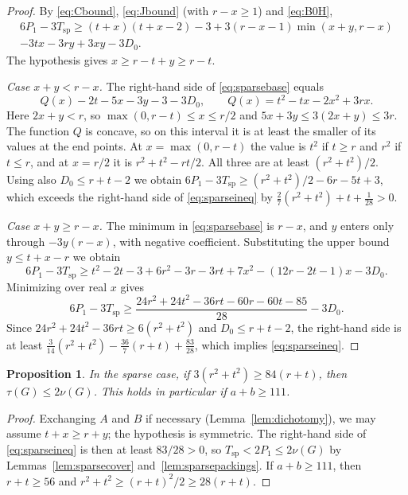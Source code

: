 \documentclass{amsart}
\newtheorem{proposition}[theorem]{Proposition}
\theoremstyle{definition}
\theoremstyle{remark}
\numberwithin{equation}{section}
\numberwithin{table}{section}
\begin{document}
\begin{proof}
By \eqref{eq:Cbound}, \eqref{eq:Jbound} (with $r-x\ge1$) and \eqref{eq:B0H},
\begin{multline}\label{eq:sparsebase}
6P_1-3T_{\mathrm{sp}}\ge(t+x)(t+x-2)-3+3(r-x-1)\min(x+y,r-x)\\
-3tx-3ry+3xy-3D_0 .
\end{multline}
The hypothesis gives $x\ge r-t+y\ge r-t$.

\emph{Case $x+y<r-x$.} The right-hand side of \eqref{eq:sparsebase} equals
\[
Q(x)-2t-5x-3y-3-3D_0,\qquad Q(x)=t^2-tx-2x^2+3rx .
\]
Here $2x+y<r$, so $\max(0,r-t)\le x\le r/2$ and $5x+3y\le3(2x+y)\le3r$. The function $Q$ is concave, so on this interval it is at least the smaller of its values at the end points. At $x=\max(0,r-t)$ the value is $t^2$ if $t\ge r$ and $r^2$ if $t\le r$, and at $x=r/2$ it is $r^2+t^2-rt/2$. All three are at least $(r^2+t^2)/2$. Using also $D_0\le r+t-2$ we obtain $6P_1-3T_{\mathrm{sp}}\ge(r^2+t^2)/2-6r-5t+3$, which exceeds the right-hand side of \eqref{eq:sparseineq} by $\frac27(r^2+t^2)+t+\frac1{28}>0$.

\emph{Case $x+y\ge r-x$.} The minimum in \eqref{eq:sparsebase} is $r-x$, and $y$ enters only through $-3y(r-x)$, with negative coefficient. Substituting the upper bound $y\le t+x-r$ we obtain
\[
6P_1-3T_{\mathrm{sp}}\ge t^2-2t-3+6r^2-3r-3rt+7x^2-(12r-2t-1)x-3D_0 .
\]
Minimizing over real $x$ gives
\[
6P_1-3T_{\mathrm{sp}}\ge\frac{24r^2+24t^2-36rt-60r-60t-85}{28}-3D_0 .
\]
Since $24r^2+24t^2-36rt\ge6(r^2+t^2)$ and $D_0\le r+t-2$, the right-hand side is at least $\frac3{14}(r^2+t^2)-\frac{36}7(r+t)+\frac{83}{28}$, which implies \eqref{eq:sparseineq}.
\end{proof}

\begin{proposition}\label{prop:sparselarge}
In the sparse case, if $3(r^2+t^2)\ge84(r+t)$, then $\tau(G)\le2\nu(G)$. This holds in particular if $a+b\ge111$.
\end{proposition}

\begin{proof}
Exchanging $A$ and $B$ if necessary (Lemma~\ref{lem:dichotomy}), we may assume $t+x\ge r+y$; the hypothesis is symmetric. The right-hand side of \eqref{eq:sparseineq} is then at least $83/28>0$, so $T_{\mathrm{sp}}<2P_1\le2\nu(G)$ by Lemmas~\ref{lem:sparsecover} and~\ref{lem:sparsepackings}. If $a+b\ge111$, then $r+t\ge56$ and $r^2+t^2\ge(r+t)^2/2\ge28(r+t)$.
\end{proof}
\end{document}
